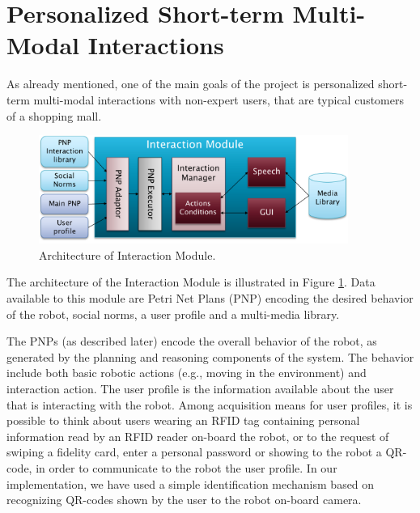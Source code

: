 \section{Personalized Short-term Multi-Modal Interactions}
\label{sec:pers}
\vspace{-0.1cm}

As already mentioned, 
one of the main goals of the {\coaches} project is personalized short-term multi-modal interactions with non-expert users, that are typical customers of a shopping mall.

\begin{figure}
\centering
\includegraphics[width=0.9\textwidth]{fig/WP3.png}
\caption{Architecture of Interaction Module.}
\label{fig:WP3}
\end{figure}

The architecture of the Interaction Module is illustrated in Figure \ref{fig:WP3}. Data available to this module are Petri Net Plans (PNP) encoding the desired behavior of the robot, social norms, a user profile and a multi-media library.

The PNPs (as described later) encode the overall behavior of the robot, as generated by the planning and reasoning components of the system. The behavior include both basic robotic actions (e.g., moving in the environment) and interaction action.
The user profile is the information available about the user that is interacting with the robot. %
Among acquisition means for user profiles, it is possible to think about users wearing an RFID tag containing personal information read by an RFID reader on-board the robot, or to the request of swiping a fidelity card, enter a personal password or showing to the robot a QR-code, in order to communicate to the robot the user profile.
In our implementation, we have used a simple identification mechanism based on recognizing QR-codes shown by the user to the robot on-board camera.

